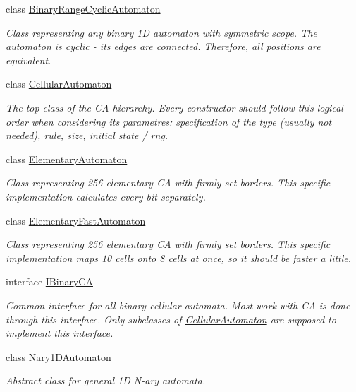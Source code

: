 \begin{DoxyCompactItemize}
class \hyperlink{class_cellular_1_1_binary_range_cyclic_automaton}{Binary\+Range\+Cyclic\+Automaton}
\begin{DoxyCompactList}\small\item\em Class representing any binary 1\+D automaton with symmetric scope. The automaton is cyclic -\/ its edges are connected. Therefore, all positions are equivalent. \end{DoxyCompactList}\item 
class \hyperlink{class_cellular_1_1_cellular_automaton}{Cellular\+Automaton}
\begin{DoxyCompactList}\small\item\em The top class of the C\+A hierarchy. Every constructor should follow this logical order when considering its parametres\+: specification of the type (usually not needed), rule, size, initial state / rng. \end{DoxyCompactList}\item 
class \hyperlink{class_cellular_1_1_elementary_automaton}{Elementary\+Automaton}
\begin{DoxyCompactList}\small\item\em Class representing 256 elementary C\+A with firmly set borders. This specific implementation calculates every bit separately. \end{DoxyCompactList}\item 
class \hyperlink{class_cellular_1_1_elementary_fast_automaton}{Elementary\+Fast\+Automaton}
\begin{DoxyCompactList}\small\item\em Class representing 256 elementary C\+A with firmly set borders. This specific implementation maps 10 cells onto 8 cells at once, so it should be faster a little. \end{DoxyCompactList}\item 
interface \hyperlink{interface_cellular_1_1_i_binary_c_a}{I\+Binary\+C\+A}
\begin{DoxyCompactList}\small\item\em Common interface for all binary cellular automata. Most work with C\+A is done through this interface. Only subclasses of {\ttfamily \hyperlink{class_cellular_1_1_cellular_automaton}{Cellular\+Automaton}} are supposed to implement this interface. \end{DoxyCompactList}\item 
class \hyperlink{class_cellular_1_1_nary1_d_automaton}{Nary1\+D\+Automaton}
\begin{DoxyCompactList}\small\item\em Abstract class for general 1\+D N-\/ary automata. \end{DoxyCompactList}\item 

\end{DoxyCompactItemize}

